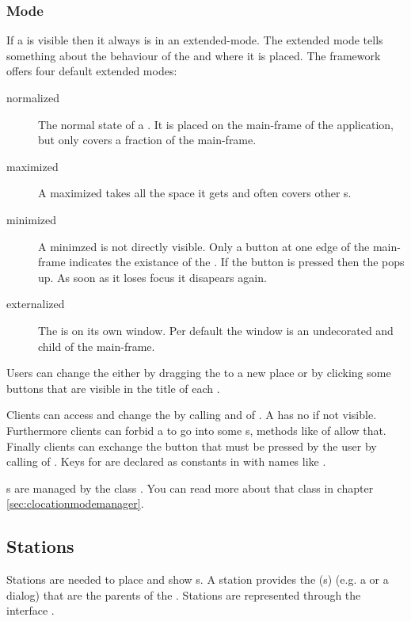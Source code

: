\subsubsection{Mode}
If a  is visible then it always is in an extended-mode. The extended mode tells something about the behaviour of the  and where it is placed. The framework offers four default extended modes:
\begin{description}
 \item[normalized] The normal state of a . It is placed on the main-frame of the application, but only covers a fraction of the main-frame.
 \item[maximized] A maximized  takes all the space it gets and often covers other s.
 \item[minimized] A minimzed  is not directly visible. Only a button at one edge of the main-frame indicates the existance of the . If the button is pressed then the  pops up. As soon as it loses focus it disapears again.
 \item[externalized] The  is on its own window. Per default the window is an undecorated  and child of the main-frame.
\end{description}

Users can change the  either by dragging the  to a new place or by clicking some buttons that are visible in the title of each . 

Clients can access and change the  by calling \linebreak {} and  of . A  has no  if not visible. Furthermore clients can forbid a  to go into some s, methods like  of  allow that. Finally clients can exchange the button that must be pressed by the user by calling  of . Keys for  are declared as  constants in  with names like .

s are managed by the class . You can read more about that class in chapter \ref{sec:clocationmodemanager}.

\subsection{Stations}
Stations are needed to place and show s. A station provides the (s) (e.g. a  or a dialog) that are the parents of the . Stations are represented through the interface .

